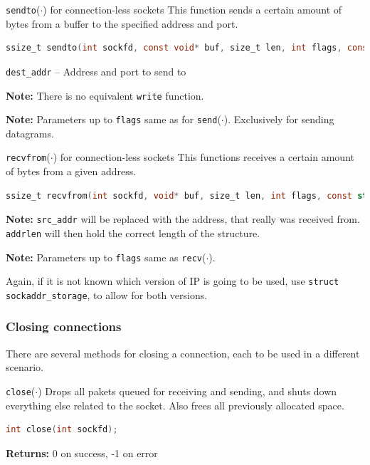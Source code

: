 \documentclass[english]{panikzettel}
\newcommand{\fkt}[1]{\texttt{#1}(\(\cdot\))}
\begin{document}
	\begin{defi}{\fkt{sendto} for connection-less sockets}
		This function sends a certain amount of bytes from a buffer to the specified address and port.
		\begin{lstlisting}[language=C]
			ssize_t sendto(int sockfd, const void* buf, size_t len, int flags, const struct sockaddr *dest_addr, socklen_t addrlen);
		\end{lstlisting}
		\tcblower
		\texttt{dest\_addr} – Address and port to send to 

		\textbf{Note:} There is no equivalent \texttt{write} function.
		
		\textbf{Note:} Parameters up to \texttt{flags} same as for \fkt{send}. 
		Exclusively for sending datagrams.
	\end{defi}

	\begin{defi}{\fkt{recvfrom} for connection-less sockets}
		This functions receives a certain amount of bytes from a given address.
		\begin{lstlisting}[language=C]
			ssize_t recvfrom(int sockfd, void* buf, size_t len, int flags, const struct sockaddr *src_addr, socklen_t *addrlen);
		\end{lstlisting}
		\tcblower
		\textbf{Note:} \texttt{src\_addr} will be replaced with the address, that really was received from. 
		\texttt{addrlen} will then hold the correct length of the structure.

		\textbf{Note:} Parameters up to \texttt{flags} same as \fkt{recv}.
	\end{defi}

	Again, if it is not known which version of IP is going to be used, use \texttt{struct sockaddr\_storage}, to allow for both versions.

	\subsubsection{Closing connections}

	There are several methods for closing a connection, each to be used in a different scenario.

	\begin{defi}{\fkt{close}}
		Drops all pakets queued for receiving and sending, and shuts down everything else related to the socket. Also frees all previously allocated space.
		\begin{lstlisting}[language=C]
			int close(int sockfd);
		\end{lstlisting}
		\tcblower
		\textbf{Returns:} 0 on success, -1 on error
	\end{defi}
\end{document}
